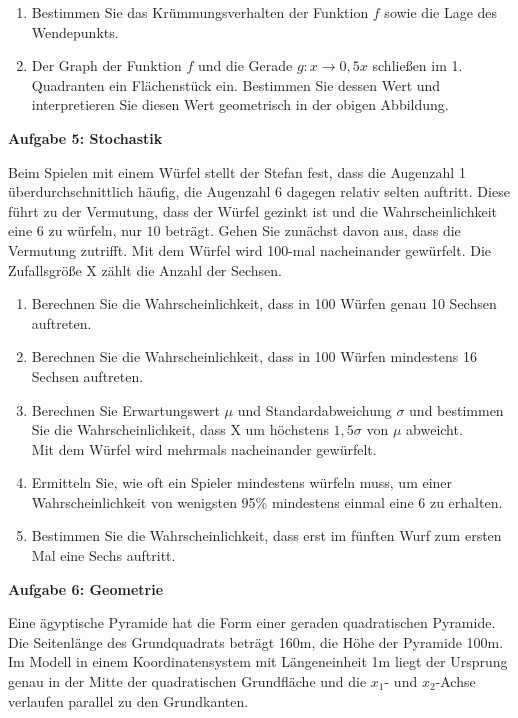 \documentclass[a4paper,12pt]{article}
\newcommand{\Aufgabe}[1]{
  {
  \vspace*{0.5cm}
  \textsf{\textbf{Aufgabe #1}}
  \vspace*{0.2cm}
  
  }
}
\begin{document}
\begin{enumerate}[label={\alph*)}]
\item Bestimmen Sie das Krümmungsverhalten der Funktion $f$ sowie die Lage des Wendepunkts.\\
  \item Der Graph der Funktion $f$ und die Gerade $ g: x\rightarrow0,5 x$ schließen im 1. Quadranten ein Flächenstück ein. Bestimmen Sie dessen Wert und interpretieren Sie diesen Wert geometrisch in der obigen Abbildung.
\end{enumerate}


\Aufgabe{5: Stochastik}
Beim Spielen mit einem Würfel stellt der Stefan fest, dass die Augenzahl 1 überdurchschnittlich häufig, die Augenzahl 6 dagegen relativ selten auftritt. Diese führt zu der Vermutung, dass der Würfel gezinkt ist und die Wahrscheinlichkeit eine 6 zu würfeln, nur $10$ beträgt. Gehen Sie zunächst davon aus, dass die Vermutung zutrifft.
Mit dem Würfel wird 100-mal nacheinander gewürfelt. Die Zufallsgröße X zählt die Anzahl der Sechsen.
\begin{enumerate}[label={\alph*)}]


\item Berechnen Sie die Wahrscheinlichkeit, dass in 100 Würfen genau 10 Sechsen auftreten.
\item Berechnen Sie die Wahrscheinlichkeit, dass in 100 Würfen mindestens 16 Sechsen auftreten.
\item Berechnen Sie Erwartungswert $\mu$ und Standardabweichung $\sigma$ und bestimmen Sie die Wahrscheinlichkeit, dass X um höchstens $1,5 \sigma$ von $ \mu$ abweicht.\\
Mit dem Würfel wird mehrmals nacheinander gewürfelt.
\item Ermitteln Sie, wie oft ein Spieler mindestens würfeln muss, um einer Wahrscheinlichkeit von wenigsten 95\% mindestens einmal eine 6 zu erhalten.
\item Bestimmen Sie die Wahrscheinlichkeit, dass erst im fünften Wurf zum ersten Mal eine Sechs auftritt.
\end{enumerate}


\newpage

\enlargethispage{2cm}
\Aufgabe{6: Geometrie}
Eine ägyptische Pyramide hat die Form einer geraden quadratischen Pyramide. Die Seitenlänge des Grundquadrats beträgt 160m, die Höhe der Pyramide 100m. Im Modell in einem Koordinatensystem mit Längeneinheit 1m liegt der Ursprung genau in der Mitte der quadratischen Grundfläche und die $x_1$- und $x_2$-Achse verlaufen parallel zu den Grundkanten. 
\end{document}
